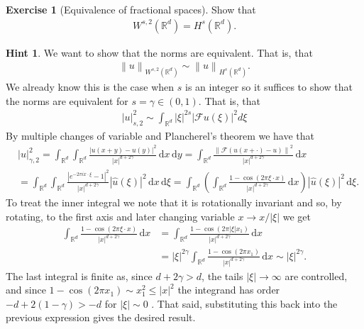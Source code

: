 \documentclass[
    a4paper,
    DIV=14,
    abstract=true,
    numbers=noenddot
]
{scrartcl}
\theoremstyle{definition}
\newtheorem{exercise}{Exercise}
\newtheorem*{hint}{Hint}
\newcommand{\wh}[1]{\widehat{#1}}
\renewcommand{\norm}[1]{\left\lVert #1 \right\rVert}\renewcommand{\abs}[1]{\left| #1 \right|}
\renewcommand{\d}{\,\mathrm{d}}\newcommand{\dx}{\,\mathrm{d}x}
\newcommand{\R}{\mathbb{R}}
\newcommand{\Ff}{\mathcal{F}}
\begin{document}
\begin{exercise}[Equivalence of fractional spaces]\label{equivalence fractional spaces}
	Show that
	\begin{align*}
		W^{s,2}(\R^d)= H^s(\R^d).
	\end{align*}
\end{exercise}
\begin{hint}
	We want to show that the norms are equivalent. That is, that
	\begin{align*}
		\norm{u}_{W^{s,2}(\R^d)}\sim \norm{u}_{H^s(\R^d)}.
	\end{align*}
	We already know this is the case when $s$ is an integer so it suffices to show that the norms are equivalent for $s= \gamma  \in (0,1)$. That is, that
	\begin{align*}
		|u|_{s,2}^2\sim \int_{\mathbb{R}^d}|\xi|^{2 s}|\mathcal{F} u(\xi)|^2 d \xi
	\end{align*}
	By multiple changes of variable and Plancherel's theorem we have that
	\begin{align*}
		 & |u|_{\gamma ,2}^2  =\int_{\R^d}\int_{\R^d}\frac{\abs{u(x+y)-u(y)}^2}{\abs{x}^{d+2\gamma	}}\d x \d y                                                                                                       = \int_{\R^d}\frac{\norm{\Ff (u(x+\cdot )-u)}^2}{\abs{x}^{d+2\gamma	}}\d x \\
		 & =\int_{\R^d}\int_{\R^d}  \frac{|e^{-2 \pi i x \cdot \xi}-1|^2}{\abs{x}^{d+2\gamma	}}|\wh{u}(\xi)|^2\d x\d\xi =\int_{\R^d}\left(\int_{\R^d}  \frac{1-\cos(2\pi \xi\cdot x)}{\abs{x}^{d+2\gamma	}}\d x\right)|\wh{u}(\xi)|^2\d\xi.
	\end{align*}
	To treat the inner integral we note that it is rotationally invariant and so, by rotating, to the first axis and later changing variable $x \to x / \abs{\xi}$ we get
	\begin{align*}
		\int_{\R^d}  \frac{1-\cos(2\pi \xi\cdot x)}{\abs{x}^{d+2\gamma	}}\d x & =\int_{\R^d}  \frac{1-\cos(2\pi \abs{\xi}x_1 )}{\abs{x}^{d+2\gamma	}}\d x                                          \\
		                                                                      & =\abs{\xi}^{2 \gamma } \int_{\R^d}  \frac{1-\cos(2\pi  x_1) }{\abs{x}^{d+2\gamma	}}\d x\sim \abs{\xi}^{2 \gamma }.
	\end{align*}
	The last integral is finite as, since $d+2\gamma >d$, the tails $\abs{\xi}\to\infty$ are controlled, and since $1-\cos(2\pi x_1)\sim x_1^2\leq \abs{x}^2$ the integrand has order $-d+2(1-\gamma)>-d$ for $\abs{\xi}\sim 0$ . That said, substituting this back into the previous expression gives the desired result.
\end{hint}
\end{document}
